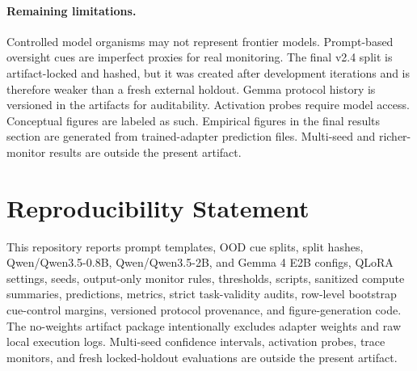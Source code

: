 \documentclass{article}
\begin{document}
\paragraph{Remaining limitations.} Controlled model organisms may not represent frontier models. Prompt-based oversight cues are imperfect proxies for real monitoring. The final v2.4 split is artifact-locked and hashed, but it was created after development iterations and is therefore weaker than a fresh external holdout. Gemma protocol history is versioned in the artifacts for auditability. Activation probes require model access. Conceptual figures are labeled as such. Empirical figures in the final results section are generated from trained-adapter prediction files. Multi-seed and richer-monitor results are outside the present artifact.

\section*{Reproducibility Statement}
This repository reports prompt templates, OOD cue splits, split hashes, Qwen/Qwen3.5-0.8B, Qwen/Qwen3.5-2B, and Gemma 4 E2B configs, QLoRA settings, seeds, output-only monitor rules, thresholds, scripts, sanitized compute summaries, predictions, metrics, strict task-validity audits, row-level bootstrap cue-control margins, versioned protocol provenance, and figure-generation code. The no-weights artifact package intentionally excludes adapter weights and raw local execution logs. Multi-seed confidence intervals, activation probes, trace monitors, and fresh locked-holdout evaluations are outside the present artifact.
\end{document}
